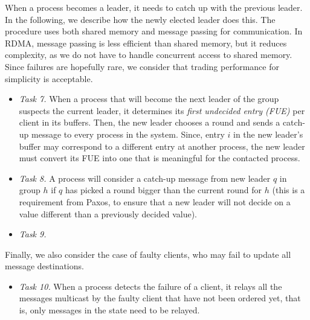 %

When a process becomes a leader, it needs to catch up with the previous leader.
In the following, we describe how the newly elected leader does this.
The procedure uses both shared memory and message passing for communication.
In RDMA, message passing is less efficient than shared memory, but it reduces complexity, as we do not have to handle concurrent access to shared memory.
Since failures are hopefully rare, we consider that trading performance for simplicity is acceptable.

\begin{itemize}
\item \emph{Task 7.} 
When a process that will become the next leader of the group suspects the current leader, it determines its \emph{first undecided entry (FUE)} per client in its buffers. 
Then, the new leader chooses a round and sends a catch-up message to every process in the system.
Since, entry $i$ in the new leader's buffer may correspond to a different entry at another process, the new leader must convert its FUE into one that is meaningful for the contacted process.

\item \emph{Task 8.} 
A process will consider a catch-up message from new leader $q$ in group $h$ if $q$ has picked a round bigger than the current round for $h$ (this is a requirement from Paxos, to ensure that a new leader will not decide on a value different than a previously decided value).


\item \emph{Task 9.} 

\end{itemize}

Finally, we also consider the case of faulty clients, who may fail to update all message destinations.

\begin{itemize}

\item \emph{Task 10.} 
When a process detects the failure of a client, it relays all the messages multicast by the faulty client that have not been ordered yet, that is, only messages in the \mcast state need to be relayed.

\end{itemize}

